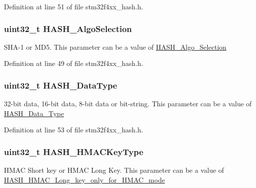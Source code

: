 Definition at line 51 of file stm32f4xx\-\_\-hash.\-h.

\hypertarget{struct_h_a_s_h___init_type_def_aaaf1a08cbec063fbcbd1c1470ff5010b}{
\subsubsection[{H\-A\-S\-H\-\_\-\-Algo\-Selection}]{\setlength{\rightskip}{0pt plus 5cm}uint32\-\_\-t H\-A\-S\-H\-\_\-\-Algo\-Selection}}\label{struct_h_a_s_h___init_type_def_aaaf1a08cbec063fbcbd1c1470ff5010b}
S\-H\-A-\/1 or M\-D5. This parameter can be a value of \hyperlink{group___h_a_s_h___algo___selection}{H\-A\-S\-H\-\_\-\-Algo\-\_\-\-Selection} 

Definition at line 49 of file stm32f4xx\-\_\-hash.\-h.

\hypertarget{struct_h_a_s_h___init_type_def_a755e3df3614cd3dcbb9a41ed92889e63}{
\subsubsection[{H\-A\-S\-H\-\_\-\-Data\-Type}]{\setlength{\rightskip}{0pt plus 5cm}uint32\-\_\-t H\-A\-S\-H\-\_\-\-Data\-Type}}\label{struct_h_a_s_h___init_type_def_a755e3df3614cd3dcbb9a41ed92889e63}
32-\/bit data, 16-\/bit data, 8-\/bit data or bit-\/string. This parameter can be a value of \hyperlink{group___h_a_s_h___data___type}{H\-A\-S\-H\-\_\-\-Data\-\_\-\-Type} 

Definition at line 53 of file stm32f4xx\-\_\-hash.\-h.

\hypertarget{struct_h_a_s_h___init_type_def_a4934882b46f2ebf5a1cd552e6793fa5c}{
\subsubsection[{H\-A\-S\-H\-\_\-\-H\-M\-A\-C\-Key\-Type}]{\setlength{\rightskip}{0pt plus 5cm}uint32\-\_\-t H\-A\-S\-H\-\_\-\-H\-M\-A\-C\-Key\-Type}}\label{struct_h_a_s_h___init_type_def_a4934882b46f2ebf5a1cd552e6793fa5c}
H\-M\-A\-C Short key or H\-M\-A\-C Long Key. This parameter can be a value of \hyperlink{group___h_a_s_h___h_m_a_c___long__key__only__for___h_m_a_c__mode}{H\-A\-S\-H\-\_\-\-H\-M\-A\-C\-\_\-\-Long\-\_\-key\-\_\-only\-\_\-for\-\_\-\-H\-M\-A\-C\-\_\-mode} 

